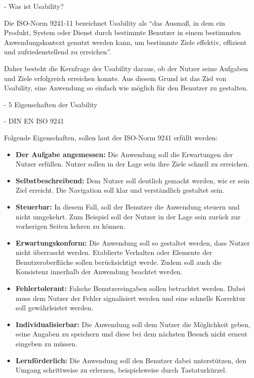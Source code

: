 - Was ist Usability?

Die ISO-Norm 9241-11 bezeichnet Usability als \enquote{das Ausmaß, in dem ein Produkt, System oder Dienst durch bestimmte Benutzer in einem bestimmten Anwendungskontext genutzt werden kann, um bestimmte Ziele effektiv, effizient und zufriedenstellend zu erreichen}.

Daher besteht die Kernfrage der Usability daraus, ob der Nutzer seine Aufgaben und Ziele erfolgreich erreichen konnte.
Aus diesem Grund ist das Ziel von Usability, eine Anwendung so einfach wie möglich für den Benutzer zu gestalten. \citep[vgl.]{jacobsen_praxisbuch_2019}

- 5 Eigenschaften der Usability

- DIN EN ISO 9241

Folgende Eigenschaften, sollen laut der ISO-Norm 9241 erfüllt werden:

\begin{itemize}
	\item \textbf{Der Aufgabe angemessen:} Die Anwendung soll die Erwartungen der Nutzer erfüllen. Nutzer sollen in der Lage sein ihre Ziele schnell zu erreichen.
	\item \textbf{Selbstbeschreibend:} Dem Nutzer soll deutlich gemacht werden, wie er sein Ziel erreicht. Die Navigation soll klar und verständlich gestaltet sein.
	\item \textbf{Steuerbar:} In diesem Fall, soll der Benutzer die Anwendung steuern und nicht umgekehrt. Zum Beispiel soll der Nutzer in der Lage sein zurück zur vorherigen Seiten kehren zu können.
	\item \textbf{Erwartungskonform:} Die Anwendung soll so gestaltet werden, dass Nutzer nicht überrascht werden. Etablierte Verhalten oder Elemente der Benutzeroberfläche sollen berücksichtigt werde. Zudem soll auch die Konsistenz innerhalb der Anwendung beachtet werden.
	\item \textbf{Fehlertolerant:} Falsche Benutzereingaben sollen betrachtet werden. Dabei muss dem Nutzer der Fehler signalisiert werden und eine schnelle Korrektur soll gewährleistet werden.
	\item \textbf{Individualisierbar:} Die Anwendung soll dem Nutzer die Möglichkeit geben, seine Angaben zu speichern und diese bei dem nächsten Besuch nicht erneut eingeben zu müssen.
	\item \textbf{Lernförderlich:} Die Anwendung soll den Benutzer dabei unterstützen, den Umgang schrittweise zu erlernen, beispielsweise durch Tastaturkürzel.
\end{itemize}

